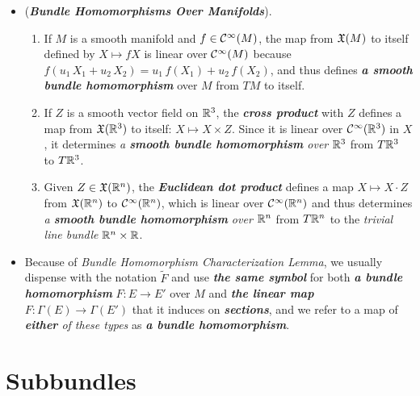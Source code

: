\documentclass[11pt]{article}
\begin{document}
\begin{itemize}
\item \begin{example} (\emph{\textbf{Bundle Homomorphisms Over Manifolds}}). \\
\begin{enumerate}
\item If $M$ is a smooth manifold and $f \in {\mathcal C}^{\infty}(M)$, the map from ${\mathfrak X}(M)$ to itself defined by $X \mapsto fX$ is linear over  ${\mathcal C}^{\infty}(M)$ because $f (u_1\,X_1 + u_2\,X_2) =  u_1\,f(X_1) + u_2\,f(X_2)$, and thus defines \emph{\textbf{a smooth bundle homomorphism}} over $M$ from $TM$ to itself.
\item If $Z$ is a smooth vector field on ${\mathbb R}^3$, the \emph{\textbf{cross product}} with $Z$ defines a map from ${\mathfrak X}({\mathbb R}^3)$ to itself: $X \mapsto X \times Z$. Since it is linear over ${\mathcal C}^{\infty}({\mathbb R}^3)$ in $X$, it determines \emph{a \textbf{smooth bundle homomorphism} over ${\mathbb R}^3$} from $T{\mathbb R}^3$ to $T{\mathbb R}^3$.
\item Given $Z \in {\mathfrak X}({\mathbb R}^n)$, the \emph{\textbf{Euclidean dot product}} defines a map $X \mapsto X \cdot Z$ from ${\mathfrak X}({\mathbb R}^n)$ to ${\mathcal C}^{\infty}({\mathbb R}^n)$, which is linear over ${\mathcal C}^{\infty}({\mathbb R}^n)$ and thus determines \emph{a \textbf{smooth bundle homomorphism} over ${\mathbb R}^n$} from $T{\mathbb R}^n$ to the \emph{trivial line bundle} ${\mathbb R}^n \times {\mathbb R}$.
\end{enumerate}
\end{example}

\item \begin{remark}
Because of \emph{Bundle Homomorphism Characterization Lemma}, we usually dispense with the notation $\widetilde{F}$ and use \emph{\textbf{the same symbol}} for both \emph{\textbf{a bundle homomorphism}} $F: E \rightarrow E'$ over $M$ and \emph{\textbf{the linear map}} $F: \Gamma(E) \rightarrow \Gamma(E')$ that it induces on \emph{\textbf{sections}}, and we refer to a map of \emph{\textbf{either} of these types} as \emph{\textbf{a bundle homomorphism}}.
\end{remark}
\end{itemize}

\section{Subbundles}

\end{document}
